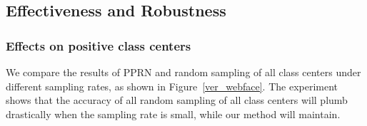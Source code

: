\documentclass[letterpaper]{article} \usepackage{style/aaai21}  \usepackage{times}  \usepackage{helvet} \usepackage{courier}  \usepackage[hyphens]{url}  \usepackage{graphicx} \usepackage{color}
\begin{document}
\begin{table*}[t]
    \centering
    \caption{Large-scale classification training comparison. The less memory occupied and the larger throughput, the better. OOM means the GPU memory overflows and the model cannot be trained. When model parallel is applied, storing weight matrices in RAM is useless, because all class centers still need to be loaded back into GPUs when calculating softmax loss.}
    \label{distributed}
\end{table*}

\subsection{Effectiveness and Robustness}
\subsubsection{Effects on positive class centers}
We compare the results of PPRN and random sampling of all class centers under different sampling rates, as shown in Figure~\ref{ver_webface}. The experiment shows that the accuracy of all random sampling of all class centers will plumb drastically when the sampling rate is small, while our method will maintain.
\end{document}
